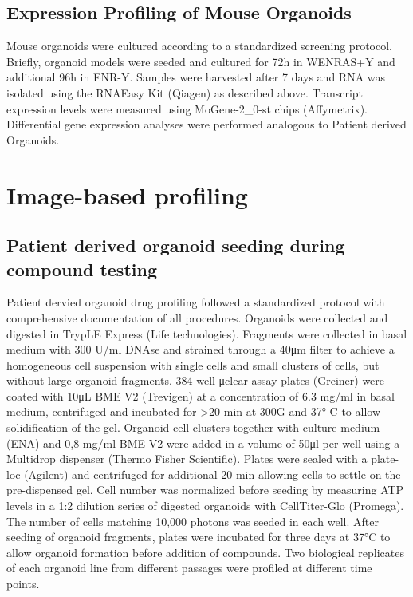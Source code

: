 \begin{flushleft}
\subsection{Expression Profiling of Mouse Organoids}
Mouse organoids were cultured according to a standardized screening protocol. Briefly, organoid models were seeded and cultured for 72h in WENRAS+Y and additional 96h in ENR-Y. Samples were harvested after 7 days and RNA was isolated using the RNAEasy Kit (Qiagen) as described above. Transcript expression levels were measured using MoGene-2\_0-st chips (Affymetrix).
Differential gene expression analyses were performed analogous to Patient derived Organoids.

\section{Image-based profiling}

\subsection{Patient derived organoid seeding during compound testing}
Patient dervied organoid drug profiling followed a standardized protocol with comprehensive documentation of all procedures. Organoids were collected and digested in TrypLE Express (Life technologies). Fragments were collected in basal medium with 300 U/ml DNAse and strained through a 40μm filter to achieve a homogeneous cell suspension with single cells and small clusters of cells, but without large organoid fragments. 384 well μclear assay plates (Greiner) were coated with 10μL BME V2 (Trevigen) at a concentration of 6.3 mg/ml in basal medium, centrifuged and incubated for >20 min at 300G and 37° C to allow solidification of the gel. Organoid cell clusters together with culture medium (ENA) and 0,8 mg/ml BME V2 were added in a volume of 50μl per well using a Multidrop dispenser (Thermo Fisher Scientific). Plates were sealed with a plate-loc (Agilent) and centrifuged for additional 20 min allowing cells to settle on the pre-dispensed gel. Cell number was normalized before seeding by measuring ATP levels in a 1:2 dilution series of digested organoids with CellTiter-Glo (Promega). The number of cells matching 10,000 photons was seeded in each well. After seeding of organoid fragments, plates were incubated for three days at 37°C to allow organoid formation before addition of compounds. Two biological replicates of each organoid line from different passages were profiled at different time points.


\end{flushleft}
